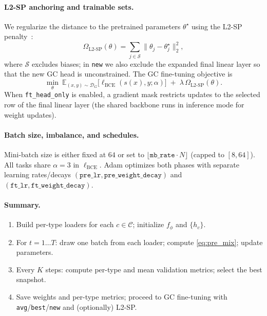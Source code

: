 \documentclass[journal,article,submit,pdftex,moreauthors]{Definitions/mdpi}
\begin{document}
\paragraph{L2-SP anchoring and trainable sets.}
We regularize the distance to the pretrained parameters $\theta^\star$ using the L2-SP penalty~\citep{Li2018_L2SP}:
\begin{equation}
\Omega_{\mathrm{L2\text{-}SP}}(\theta)=\sum_{j\in\mathcal{S}}\|\theta_j-\theta^\star_j\|_2^2,
\end{equation}
where $\mathcal{S}$ excludes biases; in \texttt{new} we also exclude the expanded final linear layer so that the new GC head is unconstrained. The GC fine-tuning objective is
\begin{equation}
\label{eq:ft_obj}
\min_{\theta}\ \mathbb{E}_{(x,y)\sim \mathcal{D}_G}\!\big[\ell_{\mathrm{BCE}}(s(x),y;\alpha)\big]\;+\;\lambda\,\Omega_{\mathrm{L2\text{-}SP}}(\theta).
\end{equation}
When \texttt{ft\_head\_only} is enabled, a gradient mask restricts updates to the selected row of the final linear layer (the shared backbone runs in inference mode for weight updates).

\paragraph{Batch size, imbalance, and schedules.}
Mini-batch size is either fixed at $64$ or set to $\lfloor \texttt{mb\_rate}\cdot N\rfloor$ (capped to $[8,64]$). All tasks share $\alpha{=}3$ in $\ell_{\mathrm{BCE}}$. Adam optimizes both phases with separate learning rates/decays $(\texttt{pre\_lr},\texttt{pre\_weight\_decay})$ and $(\texttt{ft\_lr},\texttt{ft\_weight\_decay})$.

\paragraph{Summary.}
\begin{enumerate}[topsep=0pt,itemsep=1pt,leftmargin=12pt]
\item Build per-type loaders for each $c\in\mathcal{C}$; initialize $f_\phi$ and $\{h_c\}$.
\item For $t=1\ldots T$: draw one batch from each loader; compute \eqref{eq:pre_mix}; update parameters.
\item Every $K$ steps: compute per-type and mean validation metrics; select the best snapshot.
\item Save weights and per-type metrics; proceed to GC fine-tuning with \texttt{avg}/\texttt{best}/\texttt{new} and (optionally) L2-SP.
\end{enumerate}
\end{document}
